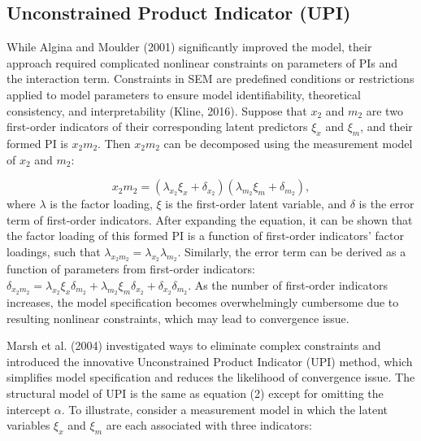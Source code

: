 \documentclass[
  man]{apa6}
\begin{document}
\hypertarget{unconstrained-product-indicator-upi}{%
\subsection{Unconstrained Product Indicator (UPI)}\label{unconstrained-product-indicator-upi}}

While Algina and Moulder (2001) significantly improved the model, their approach required complicated nonlinear constraints on parameters of PIs and the interaction term. Constraints in SEM are predefined conditions or restrictions applied to model parameters to ensure model identifiability, theoretical consistency, and interpretability (Kline, 2016). Suppose that \(x_{2}\) and \(m_{2}\) are two first-order indicators of their corresponding latent predictors \(\xi_{x}\) and \(\xi_{m}\), and their formed PI is \(x_{2}m_{2}\). Then \(x_{2}m_{2}\) can be decomposed using the measurement model of \(x_{2}\) and \(m_{2}\):

\begin{equation}
x_{2}m_{2}= (\lambda_{x_{2}}\xi_{x} + \delta_{x_{2}})(\lambda_{m_{2}}\xi_{m} + \delta_{m_{2}}),
\end{equation}
where \(\lambda\) is the factor loading, \(\xi\) is the first-order latent variable, and \(\delta\) is the error term of first-order indicators. After expanding the equation, it can be shown that the factor loading of this formed PI is a function of first-order indicators' factor loadings, such that \(\lambda_{x_{2}m_{2}} = \lambda_{x_{2}}\lambda_{m_{2}}\). Similarly, the error term can be derived as a function of parameters from first-order indicators: \(\delta_{x_{2}m_{2}} = \lambda_{x_{2}}\xi_{x}\delta_{m_{2}} + \lambda_{m_{2}}\xi_{m}\delta_{x_{2}} + \delta_{x_{2}}\delta_{m_{2}}\). As the number of first-order indicators increases, the model specification becomes overwhelmingly cumbersome due to resulting nonlinear constraints, which may lead to convergence issue.

Marsh et al. (2004) investigated ways to eliminate complex constraints and introduced the innovative Unconstrained Product Indicator (UPI) method, which simplifies model specification and reduces the likelihood of convergence issue. The structural model of UPI is the same as equation (2) except for omitting the intercept \(\alpha\). To illustrate, consider a measurement model in which the latent variables \(\xi_{x}\) and \(\xi_{m}\) are each associated with three indicators:
\end{document}

